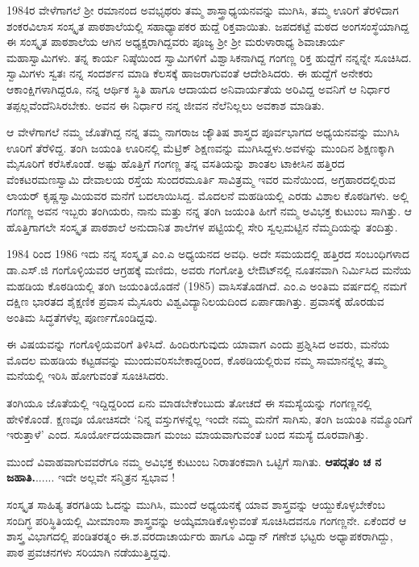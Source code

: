 {1984ರ ವೇಳೆಗಾಗಲೆ ಶ್ರೀ ರಮಾನಂದ ಅವಭೃಥರು ತಮ್ಮ ಶಾಸ್ತ್ರಾಧ್ಯಯನವನ್ನು ಮುಗಿಸಿ, ತಮ್ಮ ಊರಿಗೆ ತೆರಳಿದಾಗ ಶಂಕರವಿಲಾಸ ಸಂಸ್ಕೃತ ಪಾಠಶಾಲೆಯಲ್ಲಿ ಸಹಾಧ್ಯಾಪಕರ ಹುದ್ದೆ ರಿಕ್ತವಾಯಿತು. ಜಪದಕಟ್ಟೆ ಮಠದ ಅಂಗಸಂಸ್ಥೆಯಾಗಿದ್ದ ಈ ಸಂಸ್ಕೃತ ಪಾಠಶಾಲೆಯ ಆಗಿನ ಅಧ್ಯಕ್ಷರಾಗಿದ್ದವರು ಪೂಜ್ಯ ಶ್ರೀ ಶ್ರೀ ಮರುಳಾರಾಧ್ಯ ಶಿವಾಚಾರ್ಯ ಮಹಾಸ್ವಾಮಿಗಳು. ತನ್ನ ಕಾರ್ಯ ನಿಷ್ಠೆಯಿಂದ ಸ್ವಾಮಿಗಳಿಗೆ ವಿಶ್ವಾಸಿಕನಾಗಿದ್ದ ಗಂಗಣ್ಣ ರಿಕ್ತ ಹುದ್ದೆಗೆ ನನ್ನನ್ನೇ ಸೂಚಿಸಿದ. ಸ್ವಾಮಿಗಳು ಸ್ವತಃ ನನ್ನ ಸಂದರ್ಶನ ಮಾಡಿ ಕೆಲಸಕ್ಕೆ ಹಾಜರಾಗುವಂತೆ ಆದೇಶಿಸಿದರು. ಈ ಹುದ್ದೆಗೆ ಅನೇಕರು ಆಕಾಂಕ್ಷಿಗಳಾಗಿದ್ದರೂ, ನನ್ನ ಆರ್ಥಿಕ ಸ್ಥಿತಿ ಹಾಗೂ ಆದಾಯದ ಅನಿವಾರ್ಯತೆಯ ಅರಿವಿದ್ದ ಅವನಿಗೆ ಆ ನಿರ್ಧಾರ ತಪ್ಪಲ್ಲವೆಂದೆನಿಸಿರಬೇಕು. ಅವನ ಈ ನಿರ್ಧಾರ ನನ್ನ ಜೀವನ ನೆಲೆನಿಲ್ಲಲು ಅವಕಾಶ ಮಾಡಿತು.

ಆ ವೇಳೆಗಾಗಲೆ ನಮ್ಮ ಜೊತೆಗಿದ್ದ ನನ್ನ ತಮ್ಮ ನಾಗರಾಜ ಜ್ಯೌತಿಷ ಶಾಸ್ತ್ರದ ಪೂರ್ವಭಾಗದ ಅಧ್ಯಯನವನ್ನು ಮುಗಿಸಿ ಊರಿಗೆ ತೆರೆಳಿದ್ದ. ತಂಗಿ ಜಯಂತಿ ಊರಿನಲ್ಲಿ ಮೆಟ್ರಿಕ್ ಶಿಕ್ಷಣವನ್ನು ಮುಗಿಸಿದ್ದಳು.ಅವಳನ್ನು ಮುಂದಿನ ಶಿಕ್ಷಣಕ್ಕಾಗಿ ಮೈಸೂರಿಗೆ ಕರೆಸಿಕೊಂಡೆ. ಅಷ್ಟು ಹೊತ್ತಿಗೆ ಗಂಗಣ್ಣ ತನ್ನ ವಸತಿಯನ್ನು ಶಾಂತಲ ಟಾಕೀಸಿನ ಹತ್ತಿರದ ವೆಂಕಟರಮಣಸ್ವಾಮಿ ದೇವಾಲಯ ರಸ್ತೆಯ ಸುಂದರಮೂರ್ತಿ  \enginline{-}  ಸಾವಿತ್ರಮ್ಮ ಇವರ ಮನೆಯಿಂದ, ಅಗ್ರಹಾರದಲ್ಲಿರುವ ಲಾಯರ್ ಕೃಷ್ಣಸ್ವಾಮಿಯವರ ಮನೆಗೆ ಬದಲಾಯಿಸಿದ್ದ. ಮೊದಲನೆ ಮಹಡಿಯಲ್ಲಿ ಎರಡು ವಿಶಾಲ ಕೊಠಡಿಗಳು. ಅಲ್ಲಿ ಗಂಗಣ್ಣ ಅವನ ಇಬ್ಬರು ತಂಗಿಯರು, ನಾನು ಮತ್ತು ನನ್ನ ತಂಗಿ ಜಯಂತಿ ಹೀಗೆ ನಮ್ಮ ಅವಿಭಕ್ತ ಕುಟುಂಬ ಸಾಗಿತ್ತು. ಆ ಹೊತ್ತಿಗಾಗಲೇ ಸಂಸ್ಕೃತ ಪಾಠಶಾಲೆ ಅನುದಾನಿತ ಶಾಲೆಗಳ ಪಟ್ಟಿಯಲ್ಲಿ ಸೇರಿ ಸ್ವಲ್ಪಮಟ್ಟಿನ ನೆಮ್ಮದಿಯನ್ನು ತಂದಿತ್ತು.

1984 ರಿಂದ 1986   \enginline{-}   ಇದು ನನ್ನ ಸಂಸ್ಕೃತ ಎಂ.ಎ ಅಧ್ಯಯನದ ಅವಧಿ. ಅದೇ ಸಮಯದಲ್ಲಿ ಹತ್ತಿರದ ಸಂಬಂಧಿಗಳಾದ ಡಾ.ಎಸ್.ಜಿ ಗಂಗೊಳ್ಳಿಯವರ ಆಗ್ರಹಕ್ಕೆ ಮಣಿದು, ಅವರು ಗಂಗೋತ್ರಿ ಲೇಔಟ್‍ನಲ್ಲಿ ನೂತನವಾಗಿ ನಿರ್ಮಿಸಿದ ಮನೆಯ ಮಹಡಿಯ ಕೊಠಡಿಯಲ್ಲಿ ತಂಗಿ ಜಯಂತಿಯೊಡನೆ (1985) ವಾಸಿಸತೊಡಗಿದೆ. ಎಂ.ಎ ಅಂತಿಮ ವರ್ಷದಲ್ಲಿ ನಮಗೆ ದಕ್ಷಿಣ  ಭಾರತದ ಶೈಕ್ಷಣಿಕ ಪ್ರವಾಸ ಮೈಸೂರು ವಿಶ್ವವಿದ್ಯಾನಿಲಯದಿಂದ ಏರ್ಪಾಡಾಗಿತ್ತು. ಪ್ರವಾಸಕ್ಕೆ ಹೊರಡುವ ಅಂತಿಮ ಸಿದ್ಧತೆಗಳೆಲ್ಲ ಪೂರ್ಣಗೊಂಡಿದ್ದವು.

ಈ ವಿಷಯವನ್ನು ಗಂಗೊಳ್ಳಿಯವರಿಗೆ ತಿಳಿಸಿದೆ.  ಹಿಂದಿರುಗುವುದು ಯಾವಾಗ ಎಂದು ಪ್ರಶ್ನಿಸಿದ ಅವರು, ಮನೆಯ ಮೊದಲ ಮಹಡಿಯ ಕಟ್ಟಡವನ್ನು ಮುಂದುವರಿಸಬೇಕಾದ್ದರಿಂದ, ಕೊಠಡಿಯಲ್ಲಿರುವ ನಮ್ಮ ಸಾಮಾನನ್ನೆಲ್ಲ ತಮ್ಮ ಮನೆಯಲ್ಲಿ ಇರಿಸಿ ಹೋಗುವಂತೆ ಸೂಚಿಸಿದರು. 

ತಂಗಿಯೂ ಜೊತೆಯಲ್ಲಿ ಇದ್ದಿದ್ದರಿಂದ ಏನು ಮಾಡಬೇಕೆಂಬುದು ತೋಚದೆ ಈ ಸಮಸ್ಯೆಯನ್ನು ಗಂಗಣ್ಣನಲ್ಲಿ ಹೇಳಿಕೊಂಡೆ. ಕ್ಷಣವೂ ಯೋಚಿಸದೇ ‘ನಿನ್ನ ವಸ್ತುಗಳನ್ನೆಲ್ಲ ಇಂದೇ ನಮ್ಮ ಮನೆಗೆ ಸಾಗಿಸು, ತಂಗಿ ಜಯಂತಿ ನಮ್ಮೊಂದಿಗೆ ಇರುತ್ತಾಳೆ’ ಎಂದ. ಸೂರ್ಯೋದಯವಾದಾಗ ಮಂಜು ಮಾಯವಾಗುವಂತೆ ಬಂದ ಸಮಸ್ಯೆ ದೂರವಾಗಿತ್ತು. 

ಮುಂದೆ ವಿವಾಹವಾಗುವವರೆಗೂ ನಮ್ಮ ಅವಿಭಕ್ತ ಕುಟುಂಬ ನಿರಾತಂಕವಾಗಿ ಒಟ್ಟಿಗೆ ಸಾಗಿತು. \textbf{ಆಪದ್ಗತಂ ಚ ನ ಜಹಾತಿ.}...... ಇದೇ ಅಲ್ಲವೇ ಸನ್ಮಿತ್ರನ ಸ್ವಭಾವ ! 

ಸಂಸ್ಕೃತ ಸಾಹಿತ್ಯ ತರಗತಿಯ ಓದನ್ನು ಮುಗಿಸಿ, ಮುಂದೆ ಅಧ್ಯಯನಕ್ಕೆ ಯಾವ ಶಾಸ್ತ್ರವನ್ನು ಆಯ್ದುಕೊಳ್ಳಬೇಕೆಂಬ ಸಂದಿಗ್ಧ ಪರಿಸ್ಥಿತಿಯಲ್ಲಿ  ಮೀಮಾಂಸಾ ಶಾಸ್ತ್ರವನ್ನು  ಅಯ್ಕೆಮಾಡಿಕೊಳ್ಳುವಂತೆ ಸೂಚಿಸಿದವನೂ ಗಂಗಣ್ಣನೇ. ಏಕೆಂದರೆ ಆ ಶಾಸ್ತ್ರ ವಿಭಾಗದಲ್ಲಿ ಪಂಡಿತರತ್ನಂ ಈ.ಶ.ವರದಾಚಾರ್ಯರು ಹಾಗೂ ವಿದ್ವಾನ್ ಗಣೇಶ ಭಟ್ಟರು ಅಧ್ಯಾಪಕರಾಗಿದ್ದು, ಪಾಠ ಪ್ರವಚನಗಳು ಸರಿಯಾಗಿ ನಡೆಯುತ್ತಿದ್ದವು.

}
